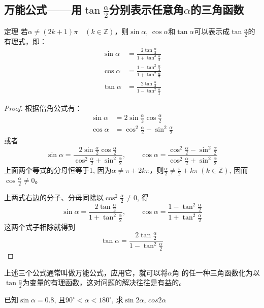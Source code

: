 \subsection{万能公式——用\texorpdfstring{$\tan\frac{\alpha}{2}$}{tan a/2}分别表示任意角\texorpdfstring{$\alpha$}{a}的三角函数}

\begin{blk}{定理}
若$\alpha\ne (2k+1)\pi\quad (k\in\mathbb{Z})$，则$\sin\alpha$, $\cos\alpha$和$\tan\alpha$可以表示成$\tan\frac{\alpha}{2}$的有理式，即：
\begin{align}
\sin\alpha &=\frac{2\tan\frac{\alpha}{2}}{1+\tan^2\frac{\alpha}{2}}\\
\cos\alpha&=\frac{1-\tan^2\frac{\alpha}{2}}{1+\tan^2\frac{\alpha}{2}}\\
\tan\alpha&=\frac{2\tan\frac{\alpha}{2}}{1-\tan^2\frac{\alpha}{2}}
\end{align}
\end{blk}

\begin{proof}
根据倍角公式有：
\[\begin{split}
    \sin\alpha &=2\sin\frac{\alpha}{2}\cos\frac{\alpha}{2}\\
    \cos\alpha &=\cos^2\frac{\alpha}{2}-\sin^2\frac{\alpha}{2}
\end{split}\]
或者
\[\sin\alpha=\frac{2\sin\frac{\alpha}{2}\cos\frac{\alpha}{2}}{\cos^2\frac{\alpha}{2}+\sin^2\frac{\alpha}{2}},\qquad \cos\alpha=\frac{\cos^2\frac{\alpha}{2}-\sin^2\frac{\alpha}{2}}{\cos^2\frac{\alpha}{2}+\sin^2\frac{\alpha}{2}}\]
上面两个等式的分母恒等于1, 因为$\alpha\ne \pi+2k\pi$，则$\frac{\alpha}{2}\ne \frac{\pi}{2}+k\pi\; (k\in\mathbb{Z})$, 因而$\cos\frac{\alpha}{2}\ne 0$。

上两式右边的分子、分母同除以$\cos^2\frac{\alpha}{2}\ne 0$, 得
\[\sin\alpha =\frac{2\tan\frac{\alpha}{2}}{1+\tan^2\frac{\alpha}{2}},\qquad
\cos\alpha=\frac{1-\tan^2\frac{\alpha}{2}}{1+\tan^2\frac{\alpha}{2}}\]
这两个式子相除就得到
\[\tan\alpha=\frac{2\tan\frac{\alpha}{2}}{1-\tan^2\frac{\alpha}{2}}\]
\end{proof}

上述三个公式通常叫做万能公式，应用它，就可以将$\alpha$角
的任一种三角函数化为以$\tan\frac{\alpha}{2}$为变量的有理函数，这对问题的解决往往是有益的。

\begin{example}
已知$\sin\alpha=0.8$, 且$90^{\circ}<\alpha<180^{\circ}$,
求$\sin2\alpha$, $cos2\alpha$

\end{example}

